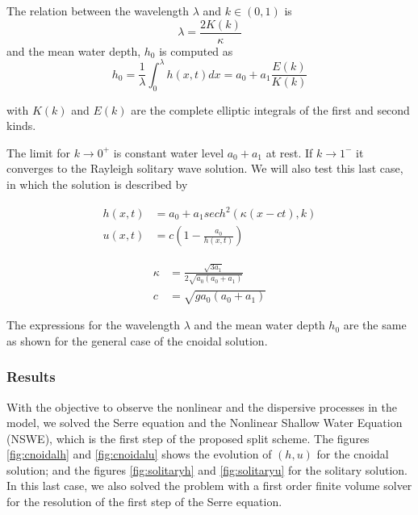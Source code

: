 \indent The relation between the wavelength $\lambda$ and $k\in(0,1)$ is $$\lambda = \frac{2K(k)}{\kappa}$$ and the mean water depth, $h_0$ is computed as $$h_0 = \frac{1}{\lambda}\int_{0}^\lambda h(x,t)dx = a_0 + a_1 \frac{E(k)}{K(k)}$$

\noindent with $K(k)$ and $E(k)$ are the complete elliptic integrals of the first and second kinds.

\indent The limit for $k\to0^+$ is constant water level $a_0+a_1$ at rest. If $k\to1^-$ it converges to the Rayleigh solitary wave solution. We will also test this last case, in which the solution is described by

\begin{align*}
    h(x,t) &= a_0 + a_1 sech^2(\kappa(x-ct),k) \\
    u(x,t) &= c\left( 1 - \frac{a_0}{h(x,t)}\right)
\end{align*}

\begin{align*}
    \kappa &= \frac{\sqrt{3a_1}}{2\sqrt{a_0(a_0+a_1)}} \\
    c &= \sqrt{g a_0(a_0+a_1)}
\end{align*}

\indent The expressions for the wavelength $\lambda$ and the mean water depth $h_0$ are the same as shown for the general case of the cnoidal solution.

\subsubsection{Results}

\indent With the objective to observe the nonlinear and the dispersive processes in the model, we solved the Serre equation and the Nonlinear Shallow Water Equation (NSWE), which is the first step of the proposed split scheme. The figures \ref{fig:cnoidalh} and \ref{fig:cnoidalu} shows the evolution of $(h,u)$ for the cnoidal solution; and the figures \ref{fig:solitaryh} and \ref{fig:solitaryu} for the solitary solution. In this last case, we also solved the problem with a first order finite volume solver for the resolution of the first step of the Serre equation.

